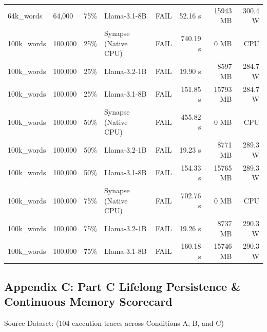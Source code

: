 {\begin{longtable}{p{1.6cm} p{1.6cm} c p{3.4cm} c r r r}
64k\_words & 64,000 & 75\% & Llama-3.1-8B & \color{gray}FAIL & 52.16 s & 15943 MB & 300.4 W \\
100k\_words & 100,000 & 25\% & Synapse (Native CPU) & \color{gray}FAIL & 740.19 s & 0 MB & CPU \\
100k\_words & 100,000 & 25\% & Llama-3.2-1B & \color{gray}FAIL & 19.90 s & 8597 MB & 284.7 W \\
100k\_words & 100,000 & 25\% & Llama-3.1-8B & \color{gray}FAIL & 151.85 s & 15793 MB & 284.7 W \\
100k\_words & 100,000 & 50\% & Synapse (Native CPU) & \color{gray}FAIL & 455.82 s & 0 MB & CPU \\
100k\_words & 100,000 & 50\% & Llama-3.2-1B & \color{gray}FAIL & 19.23 s & 8771 MB & 289.3 W \\
100k\_words & 100,000 & 50\% & Llama-3.1-8B & \color{gray}FAIL & 154.33 s & 15765 MB & 289.3 W \\
100k\_words & 100,000 & 75\% & Synapse (Native CPU) & \color{gray}FAIL & 702.76 s & 0 MB & CPU \\
100k\_words & 100,000 & 75\% & Llama-3.2-1B & \color{gray}FAIL & 19.26 s & 8737 MB & 290.3 W \\
100k\_words & 100,000 & 75\% & Llama-3.1-8B & \color{gray}FAIL & 160.18 s & 15746 MB & 290.3 W \\
\end{longtable}
\vspace{-0.5em}
}

\vspace{0.8em}
\subsection*{Appendix C: Part C Lifelong Persistence \& Continuous Memory Scorecard}
\noindent\textsf{\footnotesize Source Dataset:  (104 execution traces across Conditions A, B, and C)}
\vspace{0.2em}

